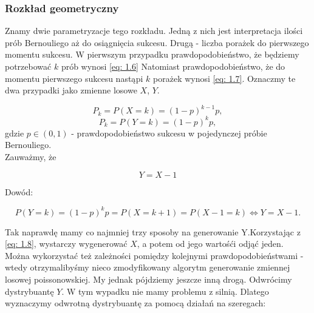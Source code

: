 \documentclass{article}
\theoremstyle{break}
\numberwithin{equation}{subsection}
\numberwithin{figure}{section}
\begin{document}
\newpage

\subsubsection{Rozkład geometryczny}

Znamy dwie parametryzacje tego rozkładu. Jedną z nich jest interpretacja ilości prób Bernouliego aż do osiągnięcia sukcesu. Drugą - liczba porażek do pierwszego momentu sukcesu. W pierwszym przypadku prawdopodobieństwo, że będziemy potrzebować $k$ prób wynosi \eqref{eq: 1.6}
Natomiast prawdopodobieństwo, że do momentu pierwszego sukcesu nastąpi $k$ porażek wynosi \eqref{eq: 1.7}. Oznaczmy te dwa przypadki jako zmienne losowe $X$, $Y$. 

\begin{equation}
P_k = P(X=k) = (1-p)^{k-1}p, \label{eq: 1.6}
\end{equation}
\begin{equation}
P_k = P(Y = k) = (1-p)^k p, \label{eq: 1.7}
\end{equation}
gdzie $p \in (0,1)$ - prawdopodobieństwo sukcesu w pojedynczej próbie Bernouliego. \\

Zauważmy, że

\begin{equation}
Y = X - 1 \label{eq: 1.8}
\end{equation}

Dowód:

$$P(Y=k) = (1-p)^k p = P(X = k+1) = P(X-1 = k) \Leftrightarrow Y=X-1. $$

Tak naprawdę mamy co najmniej trzy sposoby na generowanie Y.Korzystając z \eqref{eq: 1.8}, wystarczy wygenerować $X$, a potem od jego wartośći odjąć jeden. Można wykorzystać też zależności pomiędzy kolejnymi prawdopodobieństwami - wtedy otrzymalibyśmy nieco zmodyfikowany algorytm generowanie zmiennej losowej poissonowskiej.
My jednak pójdziemy jeszcze inną drogą. Odwrócimy dystrybuantę $Y$. W tym wypadku nie mamy problemu z silnią. Dlatego wyznaczymy odwrotną dystrybuantę za pomocą działań na szeregach:
\end{document}
